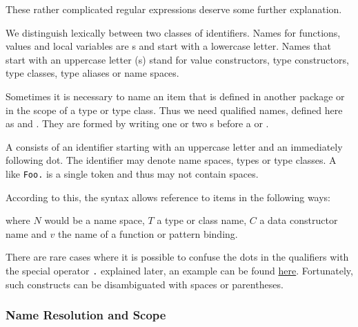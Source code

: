 These rather complicated regular expressions deserve some further
explanation.

We distinguish lexically between two classes of identifiers.
Names for functions, values and local variables are s
and start with a lowercase letter.
Names that start with an uppercase letter (s)
stand for value constructors,
type constructors, type classes, type aliases or name spaces.

Sometimes it is necessary to name an item that is defined in another
package or in the scope of a type or type class. Thus we need qualified
names, defined here as  and . They are formed
by writing one or two s before a  or .

A  consists of an identifier starting
with an uppercase letter and an immediately
following dot. The identifier may denote name spaces, types or type
classes. A  like \texttt{Foo.} is a single
token and thus may not contain spaces.

According to this, the syntax allows reference to items in the following ways:


where $N$ would be a name space, $T$ a type or class name, $C$ a
data constructor name and $v$ the name of a function or pattern binding.

There are rare cases where it is possible to confuse the dots in the qualifiers with
the special operator \texttt{.} explained later, an example can be found  \hyperref[confusedots]{here}. 
Fortunately, such constructs can be disambiguated with spaces or parentheses.


\subsubsection{Name Resolution and Scope}

